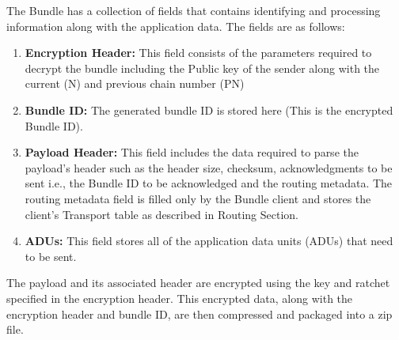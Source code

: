 The Bundle has a collection of fields that contains identifying and processing information along with the application data. The fields are as follows:
\begin{enumerate}
    \item \textbf{Encryption Header:} This field consists of the parameters required to decrypt the bundle including the Public key of the sender along with the current (N) and previous chain number (PN)
    \item \textbf{Bundle ID:} The generated bundle ID is stored here (This is the encrypted Bundle ID).
    \item \textbf{Payload Header:} This field includes the data required to parse the payload's header such as the header size, checksum, acknowledgments to be sent i.e., the Bundle ID to be acknowledged and the routing metadata. The routing metadata field is filled only by the Bundle client and stores the client's Transport table as described in Routing Section.
    \item \textbf{ADUs:} This field stores all of the application data units (ADUs) that need to be sent.
\end{enumerate}

The payload and its associated header are encrypted using the key and ratchet specified in the encryption header. This encrypted data, along with the encryption header and bundle ID, are then compressed and packaged into a zip file.
